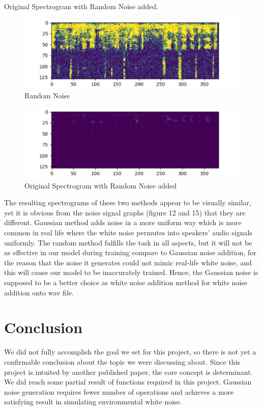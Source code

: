 \documentclass[runningheads,a4paper]{llncs}
\begin{document}
Original Spectrogram with Random Noise added.\\

\begin{figure}[H]
\includegraphics[scale=0.25]{figureE.png}
\caption{Random Noise}
\label{fig:framework}
\end{figure}

\begin{figure}[H]
\includegraphics[scale=0.25]{figureD.png}
\caption{Original Spectrogram with Random Noise added}
\label{fig:framework}
\end{figure}

The resulting spectrograms of these two methods appear to be visually similar, yet it is obvious from the noise signal graphs (figure 12 and 15) that they are different. Gaussian method adds noise in a more uniform way which is more common in real life where the white noise permutes into speakers’ audio signals uniformly. The random method fulfills the task in all aspects, but it will not be as effective in our model during training compare to Gaussian noise addition, for the reason that the noise it generates could not mimic real-life white noise, and this will cause our model to be inaccurately trained. Hence, the Gaussian noise is supposed to be a better choice as white noise addition method for white noise addition onto wav file.\\

\section{Conclusion}
We did not fully accomplish the goal we set for this project, so there is not yet a confirmable conclusion about the topic we were discussing about. Since this project is intuited by another published paper\cite{18}, the core concept is determinant. We did reach some partial result of functions required in this project. Gaussian noise generation requires fewer number of operations and achieves a more satisfying result in simulating environmental white noise.\\
\end{document}
